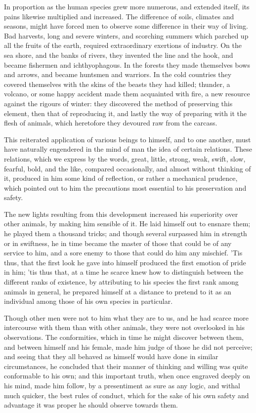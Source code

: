 \documentclass[11pt,twocolumn]{ltugboat}
\begin{document}
In proportion as the human species grew more numerous, and extended
itself, its pains likewise multiplied and increased. The difference
of soils, climates and seasons, might have forced men to observe some
difference in their way of living. Bad harvests, long and severe
winters, and scorching summers which parched up all the fruits of the
earth, required extraordinary exertions of industry. On the sea shore,
and the banks of rivers, they invented the line and the hook, and
became fishermen and ichthyophagous. In the forests they made
themselves bows and arrows, and became huntsmen and warriors. In the
cold countries they covered themselves with the skins of the beasts
they had killed; thunder, a volcano, or some happy accident made them
acquainted with fire, a new resource against the rigours of winter:
they discovered the method of preserving this element, then that of
reproducing it, and lastly the way of preparing with it the flesh of
animals, which heretofore they devoured raw from the carcass.

This reiterated application of various beings to himself, and to one
another, must have naturally engendered in the mind of man the idea of
certain relations. These relations, which we express by the words,
great, little, strong, weak, swift, slow, fearful, bold, and the like,
compared occasionally, and almost without thinking of it, produced in
him some kind of reflection, or rather a mechanical prudence, which
pointed out to him the precautions most essential to his preservation
and safety.

The new lights resulting from this development increased his
superiority over other animals, by making him sensible of it. He laid
himself out to ensnare them; he played them a thousand tricks; and
though several surpassed him in strength or in swiftness, he in time
became the master of those that could be of any service to him, and a
sore enemy to those that could do him any mischief. 'Tis thus, that
the first look he gave into himself produced the first emotion of
pride in him; 'tis thus that, at a time he scarce knew how to
distinguish between the different ranks of existence, by attributing
to his species the first rank among animals in general, he prepared
himself at a distance to pretend to it as an individual among those of
his own species in particular.

Though other men were not to him what they are to us, and he had
scarce more intercourse with them than with other animals, they were
not overlooked in his observations. The conformities, which in time
he might discover between them, and between himself and his female,
made him judge of those he did not perceive; and seeing that they all
behaved as himself would have done in similar circumstances, he
concluded that their manner of thinking and willing was quite
conformable to his own; and this important truth, when once engraved
deeply on his mind, made him follow, by a presentiment as sure as any
logic, and withal much quicker, the best rules of conduct, which for
the sake of his own safety and advantage it was proper he should
observe towards them.
\end{document}
